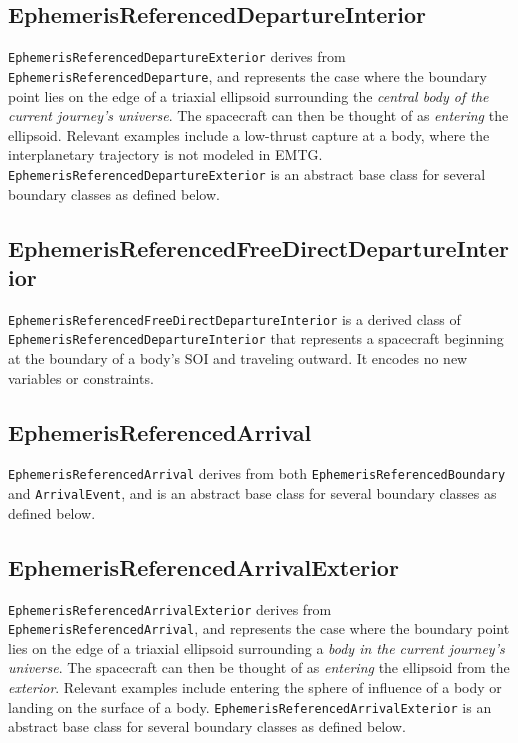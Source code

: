 \subsection{EphemerisReferencedDepartureInterior}
\label{subsubsec:EphemerisReferencedDepartureInterior}

\texttt{EphemerisReferencedDepartureExterior} derives from \texttt{EphemerisReferencedDeparture}, and represents the case where the boundary point lies on the edge of a triaxial ellipsoid surrounding the \textit{central body of the current journey's universe}. The spacecraft can then be thought of as \textit{entering} the ellipsoid. Relevant examples include a low-thrust capture at a body, where the interplanetary trajectory is not modeled in \ac{EMTG}. \texttt{EphemerisReferencedDepartureExterior} is an abstract base class for several boundary classes as defined below.


\subsection{EphemerisReferencedFreeDirectDepartureInterior}
\label{subsec:EphemerisReferencedFreeDirectDepartureInterior}

\texttt{EphemerisReferencedFreeDirectDepartureInterior} is a derived class of \texttt{EphemerisReferencedDepartureInterior} that represents a spacecraft beginning at the boundary of a body's \ac{SOI} and traveling outward. It encodes no new variables or constraints.

\subsection{EphemerisReferencedArrival}
\label{subsec:EphemerisReferencedArrival}

\texttt{EphemerisReferencedArrival} derives from both \texttt{EphemerisReferencedBoundary} and \texttt{ArrivalEvent}, and is an abstract base class for several boundary classes as defined below.

\subsection{EphemerisReferencedArrivalExterior}
\label{subsubsec:EphemerisReferencedArrivalExterior}

\texttt{EphemerisReferencedArrivalExterior} derives from \texttt{EphemerisReferencedArrival}, and represents the case where the boundary point lies on the edge of a triaxial ellipsoid surrounding a \textit{body in the current journey's universe}. The spacecraft can then be thought of as \textit{entering} the ellipsoid from the \textit{exterior}. Relevant examples include entering the sphere of influence of a body or landing on the surface of a body.  \texttt{EphemerisReferencedArrivalExterior} is an abstract base class for several boundary classes as defined below.

